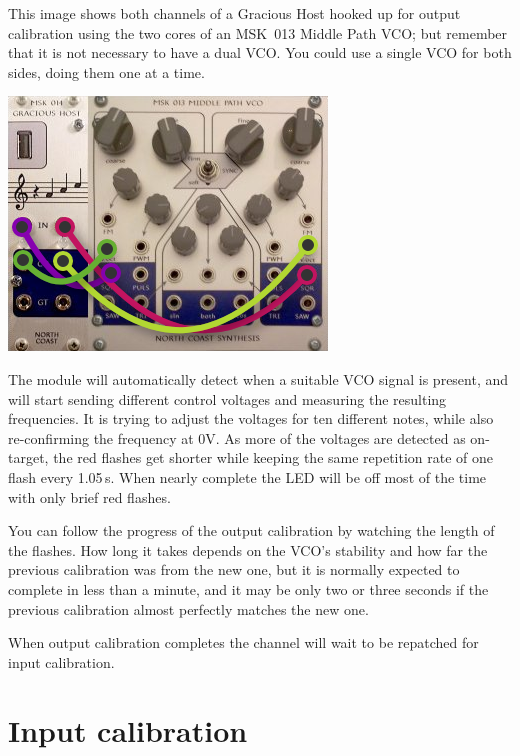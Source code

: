 This image shows both channels of a Gracious Host hooked up for output
calibration using the two cores of an MSK~013 Middle Path VCO; but remember
that it is not necessary to have a dual VCO.  You could use a single VCO for
both sides, doing them one at a time.

\nopagebreak\noindent
{\hspace*{\fill}\includegraphics[scale=0.45]{calpatch1.png}\hspace*{\fill}\par} 

The module will automatically detect when a suitable VCO signal is present,
and will start sending different control voltages and measuring the
resulting frequencies.  It is trying to adjust the voltages for ten
different notes, while also re-confirming the frequency at 0V.  As more of
the voltages are detected as on-target, the red flashes get shorter while
keeping the same repetition rate of one flash every 1.05\,s.  When nearly
complete the LED will be off most of the time with only brief red flashes.


You can follow the progress of the output calibration by watching the length
of the flashes.  How long it takes depends on the VCO's stability and how
far the previous calibration was from the new one, but it is normally
expected to complete in less than a minute, and it may be only two or three
seconds if the previous calibration almost perfectly matches the new one.

When output calibration completes the channel will wait to be repatched for
input calibration.

\section{Input calibration}

